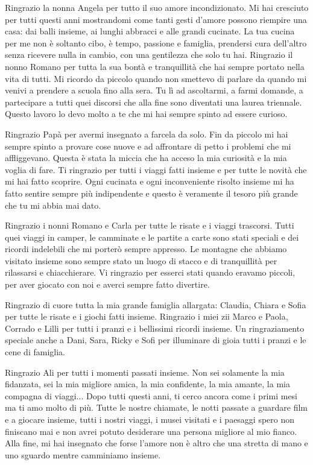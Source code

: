 Ringrazio la nonna Angela per tutto il suo amore incondizionato. Mi hai cresciuto per tutti questi anni mostrandomi come tanti gesti d'amore possono riempire una casa: dai balli insieme, ai lunghi abbracci e alle grandi cucinate. La tua cucina per me non è soltanto cibo, è tempo, passione e famiglia, prendersi cura dell'altro senza ricevere nulla in cambio, con una gentilezza che solo tu hai. 
Ringrazio il nonno Romano per tutta la sua bontà e tranquillità che hai sempre portato nella vita di tutti. Mi ricordo da piccolo quando non smettevo di parlare da quando mi venivi a prendere a scuola fino alla sera. Tu lì ad ascoltarmi, a farmi domande, a partecipare a tutti quei discorsi che alla fine sono diventati una laurea triennale. Questo lavoro lo devo molto a te che mi hai sempre spinto ad essere curioso. 

\vspace{0.2cm}

Ringrazio Papà per avermi insegnato a farcela da solo. Fin da piccolo mi hai sempre spinto a provare cose nuove e ad affrontare di petto i problemi che mi affliggevano. Questa è stata la miccia che ha acceso la mia curiosità e la mia voglia di fare. Ti ringrazio per tutti i viaggi fatti insieme e per tutte le novità che mi hai fatto scoprire. Ogni cucinata e ogni inconveniente risolto insieme mi ha fatto sentire sempre più indipendente e questo è veramente il tesoro più grande che tu mi abbia mai dato.

Ringrazio i nonni Romano e Carla per tutte le risate e i viaggi trascorsi. Tutti quei viaggi in camper, le camminate e le partite a carte sono stati speciali e dei ricordi indelebili che mi porterò sempre appresso. Le montagne che abbiamo visitato insieme sono sempre stato un luogo di stacco e di tranquillità per rilassarsi e chiacchierare. Vi ringrazio per esserci stati quando eravamo piccoli, per aver giocato con noi e averci sempre fatto divertire.

Ringrazio di cuore tutta la mia grande famiglia allargata: Claudia, Chiara e Sofia per tutte le risate e i giochi fatti insieme. Ringrazio i miei zii Marco e Paola, Corrado e Lilli per tutti i pranzi e i bellissimi ricordi insieme. Un ringraziamento speciale anche a Dani, Sara, Ricky e Sofi per illuminare di gioia tutti i pranzi e le cene di famiglia.

\vspace{0.3cm}

Ringrazio Ali per tutti i momenti passati insieme. Non sei solamente la mia fidanzata, sei la mia migliore amica, la mia confidente, la mia amante, la mia compagna di viaggi... 	Dopo tutti questi anni, ti cerco ancora come i primi mesi ma ti amo molto di più. Tutte le nostre chiamate, le notti passate a guardare film e a giocare insieme, tutti i nostri viaggi, i musei visitati e i paesaggi spero non finiscano mai e non avrei potuto desiderare una persona migliore al mio fianco. Alla fine, mi hai insegnato che forse l'amore non è altro che una stretta di mano e uno sguardo mentre camminiamo insieme.

